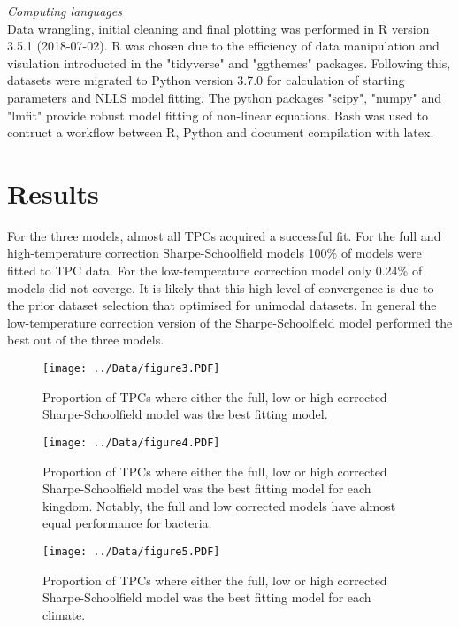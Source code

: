 \documentclass[11pt]{article}
\begin{document}
\noindent
\textit{Computing languages}\\
Data wrangling, initial cleaning and final plotting was performed in R version 3.5.1 (2018-07-02). R was chosen due to the efficiency of data manipulation and visulation introducted in the "tidyverse" and "ggthemes" packages. Following this, datasets were migrated to Python version 3.7.0 for calculation of starting parameters and NLLS model fitting. The python packages "scipy", "numpy" and "lmfit" provide robust model fitting of non-linear equations. Bash was used to contruct a workflow between R, Python and document compilation with latex.\\

\section*{Results}
For the three models, almost all TPCs acquired a successful fit. For the full and high-temperature correction Sharpe-Schoolfield models 100\% of models were fitted to TPC data. For the low-temperature correction model only 0.24\% of models did not coverge. It is likely that this high level of convergence is due to the prior dataset selection that optimised for unimodal datasets. In general the low-temperature correction version of the Sharpe-Schoolfield model performed the best out of the three models.

\begin{figure}[H]
      \texttt{[image: ../Data/figure3.PDF]}
      \centering
      \caption{Proportion of TPCs where either the full, low or high corrected Sharpe-Schoolfield model was the best fitting model.}
\end{figure}

\begin{figure}[H]
      \texttt{[image: ../Data/figure4.PDF]}
      \centering
      \caption{Proportion of TPCs where either the full, low or high corrected Sharpe-Schoolfield model was the best fitting model for each kingdom. Notably, the full and low corrected models have almost equal performance for bacteria.}
\end{figure}

\begin{figure}[H]
      \texttt{[image: ../Data/figure5.PDF]}
      \centering
      \caption{Proportion of TPCs where either the full, low or high corrected Sharpe-Schoolfield model was the best fitting model for each climate.}
\end{figure}
\end{document}
